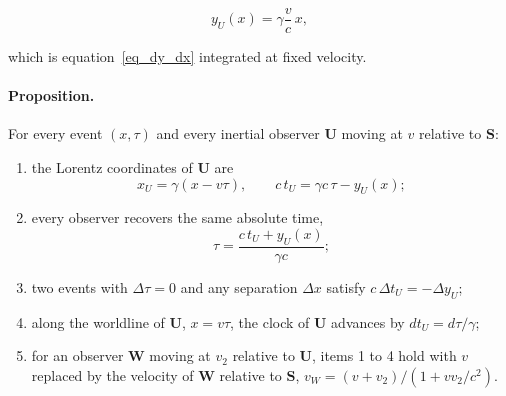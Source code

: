\documentclass[anonymous]{iopjournal}
\begin{document}
\begin{equation}\label{eq_y_offset}
    y_U(x)=\gamma\frac{v}{c}\,x ,
\end{equation}

which is equation~\eqref{eq_dy_dx} integrated at fixed velocity.

\paragraph{Proposition.} For every event $(x,\tau)$ and every inertial observer $\mathbf{U}$ moving at $v$ relative to $\mathbf{S}$:
\begin{enumerate}
\item the Lorentz coordinates of $\mathbf{U}$ are
\begin{equation}\label{eq_observer_clock}
    x_U=\gamma\left(x-v\tau\right),
    \qquad
    c\,t_U=\gamma c\,\tau-y_U(x) ;
\end{equation}
\item every observer recovers the same absolute time,
\begin{equation}\label{eq_tau_recovered}
    \tau=\frac{c\,t_U+y_U(x)}{\gamma c} ;
\end{equation}
\item two events with $\Delta\tau=0$ and any separation $\Delta x$ satisfy $c\,\Delta t_U=-\Delta y_U$;
\item along the worldline of $\mathbf{U}$, $x=v\tau$, the clock of $\mathbf{U}$ advances by $dt_U=d\tau/\gamma$;
\item for an observer $\mathbf{W}$ moving at $v_2$ relative to $\mathbf{U}$, items 1 to 4 hold with $v$ replaced by the velocity of $\mathbf{W}$ relative to $\mathbf{S}$, $v_W=(v+v_2)/(1+vv_2/c^2)$.
\end{enumerate}
\end{document}
